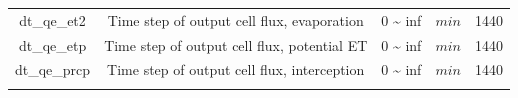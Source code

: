 \documentclass[]{scrbook}
\begin{document}
\begin{longtable}[]{@{}ccccc@{}}
\begin{minipage}[t]{0.17\columnwidth}
dt\_qe\_et2\strut
\end{minipage} & \begin{minipage}[t]{0.23\columnwidth}\centering\strut
Time step of output cell flux, evaporation\strut
\end{minipage} & \begin{minipage}[t]{0.10\columnwidth}\centering\strut
0 \textasciitilde{} inf\strut
\end{minipage} & \begin{minipage}[t]{0.10\columnwidth}\centering\strut
\(min\)\strut
\end{minipage} & \begin{minipage}[t]{0.26\columnwidth}\centering\strut
1440\strut
\end{minipage}\tabularnewline
\begin{minipage}[t]{0.17\columnwidth}\centering\strut
dt\_qe\_etp\strut
\end{minipage} & \begin{minipage}[t]{0.23\columnwidth}\centering\strut
Time step of output cell flux, potential ET\strut
\end{minipage} & \begin{minipage}[t]{0.10\columnwidth}\centering\strut
0 \textasciitilde{} inf\strut
\end{minipage} & \begin{minipage}[t]{0.10\columnwidth}\centering\strut
\(min\)\strut
\end{minipage} & \begin{minipage}[t]{0.26\columnwidth}\centering\strut
1440\strut
\end{minipage}\tabularnewline
\begin{minipage}[t]{0.17\columnwidth}\centering\strut
dt\_qe\_prcp\strut
\end{minipage} & \begin{minipage}[t]{0.23\columnwidth}\centering\strut
Time step of output cell flux, interception\strut
\end{minipage} & \begin{minipage}[t]{0.10\columnwidth}\centering\strut
0 \textasciitilde{} inf\strut
\end{minipage} & \begin{minipage}[t]{0.10\columnwidth}\centering\strut
\(min\)\strut
\end{minipage} & \begin{minipage}[t]{0.26\columnwidth}\centering\strut
1440\strut
\end{minipage}\tabularnewline
\begin{minipage}[t]{0.17\columnwidth}\centering\strut

\end{minipage}
\end{longtable}
\end{document}
